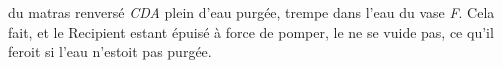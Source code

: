    du matras renversé \textit{CD}\textendash\textit{A} plein  d'eau purgée, trempe dans l'eau du vase \textit{F}.  Cela fait, et le Recipient estant épuisé à  force de pomper, le  ne se vuide pas, ce qu'il  feroit si l'eau n'estoit pas purgée.\pend

